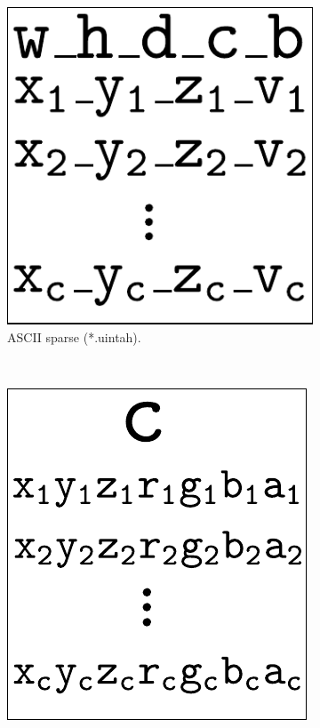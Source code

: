 \begin{figure}[htpb!]
\begin{subfigure}[t]{0.24\textwidth}
                \includegraphics[width=\textwidth]{img/file_format_ascii_sparse}
                \caption{ASCII sparse (*.uintah).}
                \label{fig:file_format_ascii_sparse}
        \end{subfigure}
        ~ %
        \begin{subfigure}[t]{0.2256\textwidth}
                \includegraphics[width=\textwidth]{img/file_format_binary}

\end{subfigure}
\end{figure}
